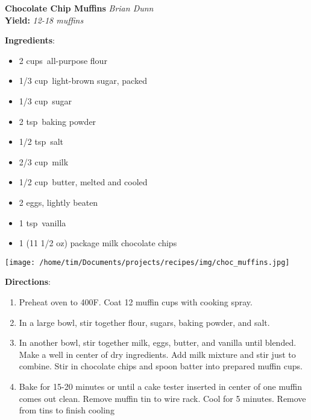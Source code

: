 \documentclass[11pt, twoside, openany]{book}
\begin{document}
\noindent\begin{minipage}[t]{\linewidth}%
{\Large\textbf{Chocolate Chip Muffins}} \label{chocolate-chip-muffins}\hfill\textit{Brian Dunn}\\
\textbf{Yield:} \textit{12-18 muffins}\\
\noindent\begin{minipage}[t]{0.78\linewidth}%
\textbf{Ingredients}:\vspace{-3mm}
\begin{multicols}{2}
\begin{itemize}\setlength\itemsep{-1mm}
\item 2 cups all-purpose flour
\item 1/3 cup light-brown sugar, packed
\item 1/3 cup sugar
\item 2 tsp baking powder
\item 1/2 tsp salt
\item 2/3 cup milk
\item 1/2 cup butter, melted and cooled
\item 2 eggs, lightly beaten
\item 1 tsp vanilla
\item 1 (11 1/2 oz) package milk chocolate chips
\end{itemize}
\end{multicols}
\end{minipage}
\noindent\begin{minipage}[t]{0.18\linewidth}
\centering \strut\vspace*{-\baselineskip}\newline
\texttt{[image: /home/tim/Documents/projects/recipes/img/choc\_muffins.jpg]}\\
\end{minipage}\vspace{3mm}
\textbf{Directions}:
\vspace{-3mm}\begin{enumerate}\setlength\itemsep{-1mm}
\item Preheat oven to 400F. Coat 12 muffin cups with cooking spray.
\item In a large bowl, stir together flour, sugars, baking powder, and salt.
\item In another bowl, stir together milk, eggs, butter, and vanilla until blended. Make a well in center of dry ingredients. Add milk mixture and stir just to combine. Stir in chocolate chips and spoon batter into prepared muffin cups.
\item Bake for 15-20 minutes or until a cake tester inserted in center of one muffin comes out clean. Remove muffin tin to wire rack. Cool for 5 minutes. Remove from tins to finish cooling
\end{enumerate}
\end{minipage}\vspace{8mm}
\end{document}
